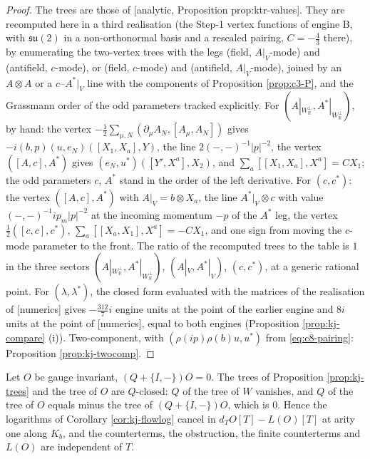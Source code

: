 \begin{proof}
The trees are those of [analytic, Proposition prop:ktr-values]. They are recomputed here in a third realisation (the Step-1 vertex functions of engine B, with $\mathfrak{su}(2)$ in a non-orthonormal basis and a rescaled pairing, $C=-\tfrac43$ there), by enumerating the two-vertex trees with the legs (field, $A|_V$-mode) and (antifield, $c$-mode), or (field, $c$-mode) and (antifield, $A|_V$-mode), joined by an $A\otimes A$ or a $c$--$A^*|_V$ line with the components of Proposition \ref{prop:c3-P}, and the Grassmann order of the odd parameters tracked explicitly. For $(A|_{W_{\mathbb R}^\perp},A^*|_{W_{\mathbb R}^\perp})$, by hand: the vertex $-\tfrac12\sum_{\mu,N}(\partial_\mu A_N,[A_\mu,A_N])$ gives $-i(b,p)(u,e_N)([X_1,X_a],Y)$, the line $2(-,-)^{-1}|p|^{-2}$, the vertex $([A,c],A^*)$ gives $(e_N,u^*)([Y',X^a],X_2)$, and $\sum_a[[X_1,X_a],X^a]=CX_1$; the odd parameters $c$, $A^*$ stand in the order of the left derivative. For $(c,c^*)$: the vertex $([A,c],A^*)$ with $A|_V=b\otimes X_a$, the line $A^*|_V\otimes c$ with value $(-,-)^{-1}ip_m|p|^{-2}$ at the incoming momentum $-p$ of the $A^*$ leg, the vertex $\tfrac12([c,c],c^*)$, $\sum_a[[X_a,X_1],X^a]=-CX_1$, and one sign from moving the $c$-mode parameter to the front. The ratio of the recomputed trees to the table is $1$ in the three sectors $(A|_{W_{\mathbb R}^\perp},A^*|_{W_{\mathbb R}^\perp})$, $(A|_V,A^*|_V)$, $(c,c^*)$, at a generic rational point. For $(\lambda,\lambda^*)$, the closed form evaluated with the matrices of the realisation of [numerics] gives $-\tfrac{312}{7}i$ engine units at the point of the earlier engine and $8i$ units at the point of [numerics], equal to both engines (Proposition \ref{prop:kj-compare} (i)). Two-component, with $(\rho(ip)\rho(b)u,u^*)$ from \eqref{eq:c8-pairing}: Proposition \ref{prop:kj-twocomp}.
\end{proof}

\begin{proposition}
\label{prop:kj-nocore}
Let $O$ be gauge invariant, $(Q+\{I,-\})O=0$. The trees of Proposition \ref{prop:kj-trees} and the tree of $O$ are $Q$-closed: $Q$ of the tree of $W$ vanishes, and $Q$ of the tree of $O$ equals minus the tree of $(Q+\{I,-\})O$, which is $0$. Hence the logarithms of Corollary \ref{cor:kj-flowlog} cancel in $d_TO[T]-L(O)[T]$ at arity one along $K_b$, and the counterterms, the obstruction, the finite counterterms and $L(O)$ are independent of $T$.
\end{proposition}

